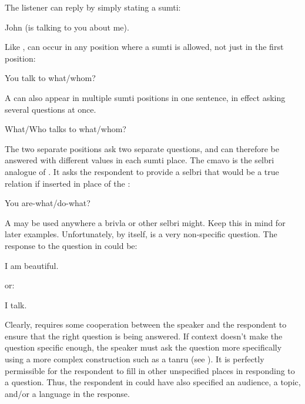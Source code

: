 The listener can reply by simply stating a sumti:
\begin{example}
\n
John (is talking to you about me).
\end{example}

Like ,  can occur in any position where a sumti is allowed, not just in the first position:
\begin{example}
   \n
You talk to what/whom?
\end{example}

A  can also appear in multiple sumti positions in one sentence, in effect asking several questions at once.
\begin{example}
   \n
What/Who talks to what/whom?
\end{example}

The two separate  positions ask two separate questions, and can therefore be answered with different values in each sumti place. The cmavo  is the selbri analogue of . It asks the respondent to provide a selbri that would be a true relation if inserted in place of the :
\begin{example}
  \n
You are-what/do-what?
\end{example}

A  may be used anywhere a brivla or other selbri might. Keep this in mind for later examples. Unfortunately, by itself,  is a very non-specific question. The response to the question in  could be:
\begin{example}
  \n
I am beautiful.
\end{example}

{\noindent}or:
\begin{example}
  \n
I talk.
\end{example}

Clearly,  requires some cooperation between the speaker and the respondent to ensure that the right question is being answered. If context doesn't make the question specific enough, the speaker must ask the question more specifically using a more complex construction such as a tanru (see ). It is perfectly permissible for the respondent to fill in other unspecified places in responding to a  question. Thus, the respondent in  could have also specified an audience, a topic, and/or a language in the response.

